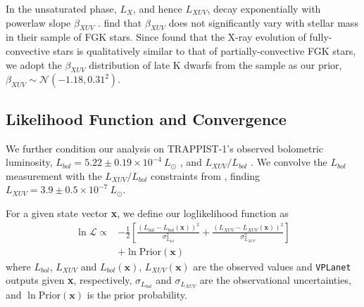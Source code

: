 \documentclass[twocolumn]{aastex62}
\newcommand{\vplanet}[0]{\texttt{VPLanet}\xspace}
\begin{document}
In the unsaturated phase, $L_{X}$, and hence $L_{XUV}$, decay exponentially with powerlaw slope $\beta_{XUV}$ \citep{Ribas2005}. \citet{Jackson2012} find that $\beta_{XUV}$ does not significantly vary with stellar mass in their sample of FGK stars. Since \citet{Wright2016} found that the X-ray evolution of fully-convective stars is qualitatively similar to that of partially-convective FGK stars, we adopt the $\beta_{XUV}$ distribution of late K dwarfs from the \citet{Jackson2012} sample as our prior, $\beta_{XUV} \sim \mathcal{N}(-1.18, 0.31^2)$.


\subsection{Likelihood Function and Convergence} \label{sec:mcmc:like}

We further condition our analysis on TRAPPIST-1's observed bolometric luminosity, $L_{bol} = 5.22 \pm{0.19} \times 10^{-4} \ L_{\odot}$ \citep{vanGrootel2018}, and $L_{XUV}/L_{bol}$ \citep{Wheatley2017}. We convolve the \citet{vanGrootel2018} $L_{bol}$ measurement with the $L_{XUV}/L_{bol}$ constraints from \citet{Wheatley2017}, finding $L_{XUV} = 3.9 \pm{0.5} \times 10^{-7} \ L_{\odot}$.

For a given state vector \textbf{x}, we define our loglikelihood function as
\small
\begin{equation} \label{eqn:lnlike}
\begin{split}
    \ln \mathcal{L} \propto & -\frac{1}{2} \left[ \frac{(L_{bol} - L_{bol}(\textbf{x}))^2}{\sigma_{L_{bol}}^2} + \frac{(L_{XUV} - L_{XUV}(\textbf{x}))^2}{\sigma_{L_{XUV}}^2} \right] \\
    & + \ln \mathrm{Prior}(\textbf{x})
\end{split}
\end{equation}
\normalsize
where $L_{bol}$, $L_{XUV}$ and $L_{bol}(\textbf{x})$, $L_{XUV}(\textbf{x})$ are the observed values and \vplanet outputs given \textbf{x}, respectively, $\sigma_{L_{bol}}$ and $\sigma_{L_{XUV}}$ are the observational uncertainties, and $\ln \mathrm{Prior}(\textbf{x})$ is the prior probability. 
\end{document}
